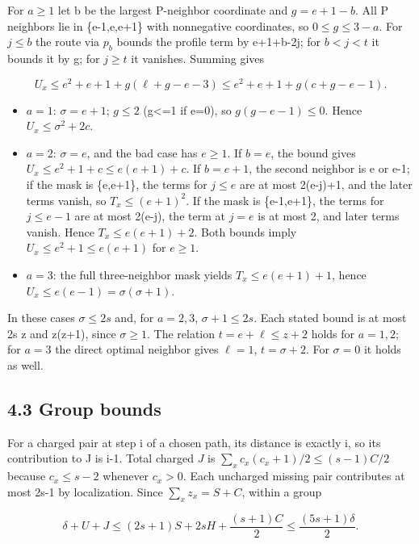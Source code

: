 \documentclass[
  11pt,
]{article}
\providecommand{\tightlist}{%
  \setlength{\itemsep}{0pt}\setlength{\parskip}{0pt}}
\begin{document}
For \(a\ge 1\) let b be the largest P-neighbor coordinate and
\(g=e+1-b\). All P neighbors lie in \{e-1,e,e+1\} with nonnegative
coordinates, so \(0\le g\le 3-a\). For \(j\le b\) the route via
\(p_{b}\) bounds the profile term by e+1+b-2j; for \(b<j<t\) it bounds
it by g; for \(j\ge t\) it vanishes. Summing gives

\[U_x\le e^2+e+1+g(\ell+g-e-3)
\le e^2+e+1+g(c+g-e-1).\]

\begin{itemize}
\tightlist
\item
  \(a=1\): \(\sigma =e+1\); \(g\le 2\) (g\textless=1 if e=0), so
  \(g(g-e-1)\le 0\). Hence \(U_{x}\le \sigma ^2+2c\).
\item
  \(a=2\): \(\sigma =e\), and the bad case has \(e\ge 1\). If \(b=e\),
  the bound gives \(U_{x}\le e^2+1+c\le e(e+1)+c\). If \(b=e+1\), the
  second neighbor is e or e-1; if the mask is \{e,e+1\}, the terms for
  \(j\le e\) are at most 2(e-j)+1, and the later terms vanish, so
  \(T_{x}\le (e+1)^2\). If the mask is \{e-1,e+1\}, the terms for
  \(j\le e-1\) are at most 2(e-j), the term at \(j=e\) is at most 2, and
  later terms vanish. Hence \(T_{x}\le e(e+1)+2\). Both bounds imply
  \(U_{x}\le e^2+1\le e(e+1)\) for \(e\ge 1\).
\item
  \(a=3\): the full three-neighbor mask yields \(T_{x}\le e(e+1)+1\),
  hence \(U_{x}\le e(e-1)=\sigma (\sigma +1)\).
\end{itemize}

In these cases \(\sigma \le 2s\) and, for \(a=2,3\),
\(\sigma +1\le 2s\). Each stated bound is at most 2s z and z(z+1), since
\(\sigma \ge 1\). The relation \(t=e+\ell \le z+2\) holds for \(a=1,2\);
for \(a=3\) the direct optimal neighbor gives \(\ell =1\),
\(t=\sigma +2\). For \(\sigma =0\) it holds as well.

\subsection{4.3 Group bounds}\label{group-bounds}

For a charged pair at step i of a chosen path, its distance is exactly
i, so its contribution to J is i-1. Total charged \(J\) is
\(\sum_x c_x(c_x+1)/2\le (s-1)C/2\) because \(c_{x}\le s-2\) whenever
\(c_{x}>0\). Each uncharged missing pair contributes at most 2s-1 by
localization. Since \(\sum_x z_x=S+C\), within a group

\[\delta+U+J\le(2s+1)S+2sH+\frac{(s+1)C}{2}\le\frac{(5s+1)\delta}{2}.\tag{B1'}\]
\end{document}
